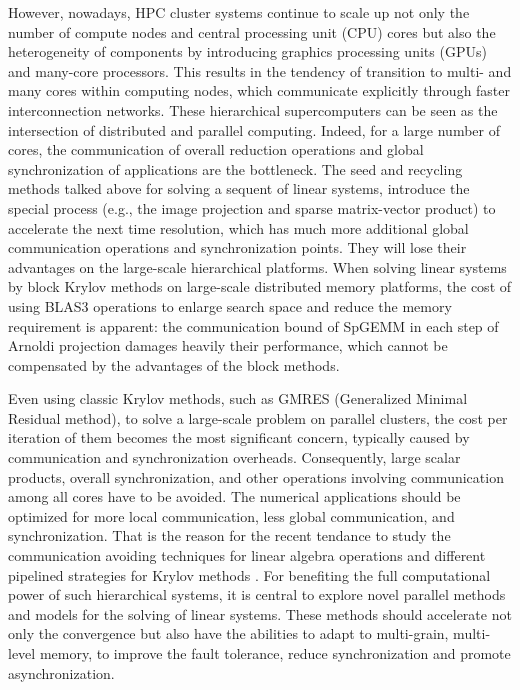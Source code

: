 However, nowadays, HPC cluster systems continue to scale up not only the number of compute nodes and central processing unit (CPU) cores but also the heterogeneity of components by introducing graphics processing units (GPUs) and many-core processors. This results in the tendency of transition to multi- and many cores within computing nodes, which communicate explicitly through faster interconnection networks. These hierarchical supercomputers can be seen as the intersection of distributed and parallel computing. Indeed, for a large number of cores, the communication of overall reduction operations and global synchronization of applications are the bottleneck. The seed and recycling methods talked above for solving a sequent of linear systems, introduce the special process (e.g., the image projection and sparse matrix-vector product) to accelerate the next time resolution, which has much more additional global communication operations and synchronization points. They will lose their advantages on the large-scale hierarchical platforms. When solving linear systems by block Krylov methods on large-scale distributed memory platforms, the cost of using BLAS3 operations to enlarge search space and reduce the memory requirement is apparent: the communication bound of SpGEMM in each step of Arnoldi projection damages heavily their performance, which cannot be compensated by the advantages of the block methods.

Even using classic Krylov methods, such as GMRES (Generalized Minimal Residual method), to solve a large-scale problem on parallel clusters, the cost per iteration of them becomes the most significant concern, typically caused by communication and synchronization overheads. Consequently, large scalar products, overall synchronization, and other operations involving communication among all cores have to be avoided. The numerical applications should be optimized for more local communication, less global communication, and synchronization. That is the reason for the recent tendance to study the communication avoiding techniques for linear algebra operations \cite{demmel2008avoiding, hoemmen2010communication, carson2015communication} and different pipelined strategies for Krylov methods \cite{ghysels2013hiding, morgan2016stochastic, cools2017communication}. For benefiting the full computational power of such hierarchical systems, it is central to explore novel parallel methods and models for the solving of linear systems. These methods should accelerate not only the convergence but also have the abilities to adapt to multi-grain, multi-level memory, to improve the fault tolerance, reduce synchronization and promote asynchronization.


